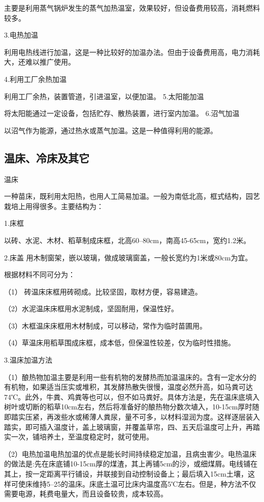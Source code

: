 \documentclass{ctexbook}
\begin{document}
主要是利用蒸气锅炉发生的蒸气加热温室，效果较好，但设备费用较高，消耗燃料较多。

3.电热加温

利用电热线进行加温，这是一种比较好的加温办法。但由于设备费用高，电力消耗大，还难以推广使用。

4.利用工厂余热加温

利用工厂余热，装置管道，引进温室，以便加温。
5.太阳能加温

将太阳能通过一定设备，包括贮存、散热装置，进行室内加温。
6.沼气加温

以沼气作为能源，通过热水或蒸气加温。这是一种值得利用的能源。
\subsection{温床、冷床及其它}
温床

一种苗床，既利用太阳热，也用人工简易加温。一般为南低北高，框式结构，园艺栽培上用得很多。主要结构为：

1.床框

以砖、水泥、木材、稻草制成床框，北高60--80cm，南高45-65cm，宽约1.2米。

2.床盖
用木制窗架，嵌以玻璃，做成玻璃窗盖，一般长宽约为1米或80cm为宜。

根据材料不同可分为：

（1）	砖温床床框用砖砌成。比较坚固，取材方便，容易建造。

（2）水泥温床床框用水泥制成，坚固耐用，保温性好。

（3）木框温床床框用木材制成，可以移动，常作为临时苗圃用。

（4）草温床用稻草围成床框，成本低，但保温性较差，仅为临时性措施。

3.温床加温方法

（1）酿热物加温主要是利用一些有机物的发酵热而加温温床的。含有一定水分的有机物，如果适当压实或堆积，其发酵热散失很慢，温度必然升高，如马粪可达74℃。此外，牛粪、鸡粪等也可以，但不如马粪好。具体方法是，先在温床底填入树叶或切断的稻草10cm左右，然后将准备好的酿热物分数次埴入，10-15cm厚时随即踏实压紧，再泼些水或稀薄人粪尿，量不可多，以材料湿润为度。这样逐层装入踏实，即可插入温度计，盖上玻璃窗，并覆盖草帘，四、五天后温度可上升，再踏实一次，铺培养土，至温度稳定时，就可使用。

（2）电热加温电热加温的优点是能长时间持续稳定加温，且病虫害少。电热温床的做法是:先在床底铺10-15cm厚的煤渣，其上再铺5cm的沙，或细煤屑。电线铺在其上，按一定距离平行铺设，并联接到自动控制设备上；最后填入15cm土壤，这样可使床维持5--25的温床。床底土温可比床内温度高5℃左右。但是，种方法不仅需要电源，耗费电量大，而且设备较贵，成本较高。
\end{document}
